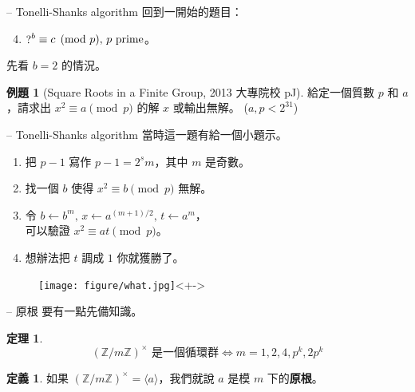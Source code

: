 \documentclass[notheorems,xcolor=dvipsnames]{beamer}
\newcommand*{\bZ}{\mathbb{Z}}
\theoremstyle{definition}
\newtheorem{theorem}{定理}
\newtheorem{problem}{例題}
\newtheorem{definition}{定義}
\renewcommand*{\emph}[1]{{\bf #1}}
\begin{document}
\begin{frame}{{\secname} -- Tonelli-Shanks algorithm}
  回到一開始的題目：
  \begin{enumerate}
    \setcounter{enumi}{3}
    \item $\raisebox{-.2mm}{\text{?}}^{b} \equiv c \pmod{p},\, p \text{ prime}$。
  \end{enumerate}
  \pause

  \bigskip
  先看 $b = 2$ 的情況。
  \begin{problem}[Square Roots in a Finite Group, 2013 大專院校 pJ]
    給定一個質數 $p$ 和 $a$，請求出 $x^2 \equiv a \pmod{p}$ 的解 $x$ 或輸出無解。
    ($a, p < 2^{31}$)
  \end{problem}
\end{frame}

\begin{frame}[t]{{\secname} -- Tonelli-Shanks algorithm}
  當時這一題有給一個小題示。

  \begin{enumerate}
    \item 把 $p-1$ 寫作 $p-1 = 2^s m$，其中 $m$ 是奇數。
    \item 找一個 $b$ 使得 $x^2 \equiv b \pmod{p}$ 無解。
    \item 令 $b \gets b^m,\, x \gets a^{(m+1)/2},\, t \gets a^m$，\\
      可以驗證 $x^2 \equiv at \pmod{p}$。
    \item 想辦法把 $t$ 調成 $1$ 你就獲勝了。
  \end{enumerate}
  \pause

  \begin{figure}
    \centering
    \texttt{[image: figure/what.jpg]}<+->
  \end{figure}
\end{frame}

\begin{frame}{{\secname} -- 原根}
  要有一點先備知識。\pause

  \bigskip
  \begin{theorem}
    \vspace{-1em}
    \[ (\bZ / m\bZ)^{\times} \text{ 是一個循環群} \iff m = 1, 2, 4, p^k, 2p^k \]
  \end{theorem}
  \pause

  \bigskip
  \begin{definition}
    如果 $(\bZ / m\bZ)^{\times} = \langle a \rangle$，我們就說 $a$ 是模 $m$ 下的\emph{原根}。
  \end{definition}
\end{frame}
\end{document}

